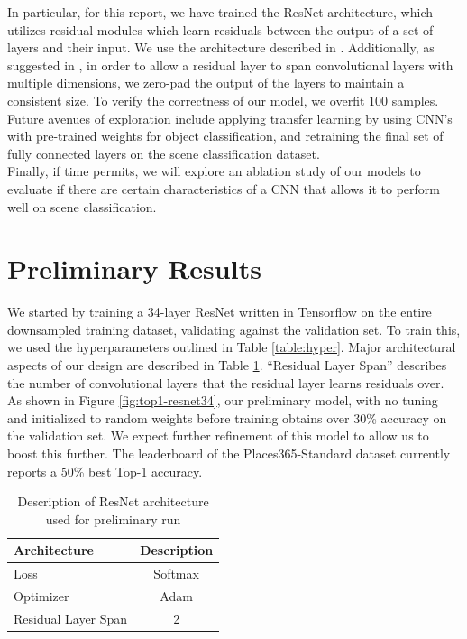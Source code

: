 \documentclass[10pt,twocolumn,letterpaper]{article}
\begin{document}
In particular, for this report, we have trained the ResNet architecture, which
utilizes residual modules which learn residuals between the output of a set of\\
layers and their input. We use the architecture described in \cite{ResNet}.
Additionally, as suggested in \cite{ResNet}, in order to allow a residual layer
to span convolutional layers with multiple dimensions, we zero-pad the output
of the layers to maintain a consistent size. To verify the correctness of our
model, we overfit 100 samples.\\

Future avenues of exploration include applying transfer learning by using
CNN's with pre-trained weights for object classification, and retraining the
final set of fully connected layers on the scene classification dataset.\\

Finally, if time permits, we will explore an ablation study of our models to
evaluate if there are certain characteristics of a CNN that allows it to perform
well on scene classification.\\

\section{Preliminary Results}

We started by training a 34-layer ResNet written in Tensorflow on the entire
downsampled training dataset, validating against the validation set. To train
this, we used the hyperparameters outlined in Table \ref{table:hyper}. Major
architectural aspects of our design are described in Table \ref{table:arch}.
``Residual Layer Span'' describes the number of convolutional layers that the
residual layer learns residuals over. \\

As shown in Figure \ref{fig:top1-resnet34}, our preliminary model, with no
tuning and initialized to random weights before training obtains over 30\%
accuracy on the validation set. We expect further refinement of this model to
allow us to boost this further. The leaderboard of the Places365-Standard dataset
currently reports a 50\% best Top-1 accuracy.\\

\begin{table}
\begin{center}
\begin{tabular}{|l|c|}
\hline
Architecture & Description \\
\hline\hline
Loss & Softmax\\
Optimizer & Adam\\
Residual Layer Span & 2 \\
\hline
\end{tabular}
\end{center}
\caption{Description of ResNet architecture used for preliminary run}
\label{table:arch}
\end{table}
\end{document}
